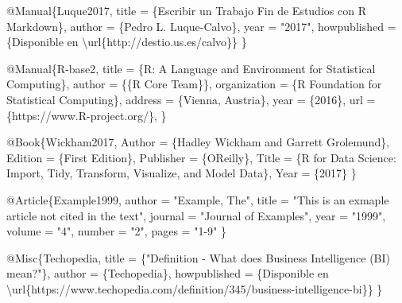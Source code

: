\documentclass[12pt,a4paper,oneside,]{article}
\newenvironment{Shaded}{\begin{snugshade}}{\end{snugshade}}
\newcommand{\CharTok}[1]{\textcolor[rgb]{0.31,0.60,0.02}{#1}}
\newcommand{\DataTypeTok}[1]{\textcolor[rgb]{0.13,0.29,0.53}{#1}}
\newcommand{\NormalTok}[1]{#1}
\newcommand{\OtherTok}[1]{\textcolor[rgb]{0.56,0.35,0.01}{#1}}
\newcommand{\StringTok}[1]{\textcolor[rgb]{0.31,0.60,0.02}{#1}}
\newcommand{\VariableTok}[1]{\textcolor[rgb]{0.00,0.00,0.00}{#1}}
\numberwithin{dummy}{section}
\theoremstyle{ocrenumbox}
\theoremstyle{blacknumex}
\theoremstyle{blacknumbox}
\theoremstyle{ocrenum}
\theoremstyle{ocrenum}
\begin{document}
\begin{Shaded}
\begin{Highlighting}[]
\VariableTok{@Manual}\NormalTok{\{}\OtherTok{Luque2017}\NormalTok{,}
  \DataTypeTok{title}\NormalTok{ = \{Escribir un Trabajo Fin de Estudios con R Markdown\},}
  \DataTypeTok{author}\NormalTok{ = \{Pedro L. Luque{-}Calvo\},}
  \DataTypeTok{year}\NormalTok{ = "}\StringTok{2017}\NormalTok{",}
  \DataTypeTok{howpublished}\NormalTok{ = \{Disponible en }\CharTok{\textbackslash{}url}\NormalTok{\{http://destio.us.es/calvo\}\}}
\NormalTok{\}}

\VariableTok{@Manual}\NormalTok{\{}\OtherTok{R}\NormalTok{{-}}\OtherTok{base2}\NormalTok{,}
  \DataTypeTok{title}\NormalTok{ = \{R: A Language and Environment for Statistical}
\NormalTok{    Computing\},}
  \DataTypeTok{author}\NormalTok{ = \{\{R Core Team\}\},}
  \DataTypeTok{organization}\NormalTok{ = \{R Foundation for Statistical Computing\},}
  \DataTypeTok{address}\NormalTok{ = \{Vienna, Austria\},}
  \DataTypeTok{year}\NormalTok{ = \{2016\},}
  \DataTypeTok{url}\NormalTok{ = \{https://www.R{-}project.org/\},}
\NormalTok{\}}


\VariableTok{@Book}\NormalTok{\{}\OtherTok{Wickham2017}\NormalTok{,}
    \DataTypeTok{Author}\NormalTok{ = \{Hadley Wickham and Garrett Grolemund\},}
    \DataTypeTok{Edition}\NormalTok{ = \{First Edition\},}
    \DataTypeTok{Publisher}\NormalTok{ = \{O\textquotesingle{}Reilly\},}
    \DataTypeTok{Title}\NormalTok{ = \{R for Data Science: Import, Tidy, Transform, }
\NormalTok{    Visualize, and Model Data\},}
    \DataTypeTok{Year}\NormalTok{ = \{2017\}}
\NormalTok{\}}

\VariableTok{@Article}\NormalTok{\{}\OtherTok{Example1999}\NormalTok{,}
    \DataTypeTok{author}\NormalTok{  = "}\StringTok{Example, The}\NormalTok{",}
    \DataTypeTok{title}\NormalTok{   = "}\StringTok{This is an exmaple article not cited in the text}\NormalTok{",}
    \DataTypeTok{journal}\NormalTok{ = "}\StringTok{Journal of Examples}\NormalTok{",}
    \DataTypeTok{year}\NormalTok{    = "}\StringTok{1999}\NormalTok{",}
    \DataTypeTok{volume}\NormalTok{  = "}\StringTok{4}\NormalTok{",}
    \DataTypeTok{number}\NormalTok{  = "}\StringTok{2}\NormalTok{",}
    \DataTypeTok{pages}\NormalTok{   = "}\StringTok{1{-}9}\NormalTok{"}
\NormalTok{\}}

\VariableTok{@Misc}\NormalTok{\{}\OtherTok{Techopedia}\NormalTok{,}
  \DataTypeTok{title}\NormalTok{ = \{"Definition {-} What does Business Intelligence (BI) mean?"\},}
  \DataTypeTok{author}\NormalTok{ = \{Techopedia\},}
  \DataTypeTok{howpublished}\NormalTok{ = \{Disponible en}
  \CharTok{\textbackslash{}url}\NormalTok{\{https://www.techopedia.com/definition/345/business{-}intelligence{-}bi\}\}}
\NormalTok{\}}


\end{Highlighting}
\end{Shaded}
\end{document}
